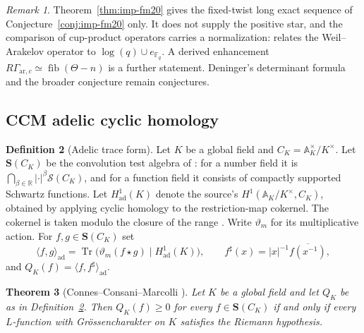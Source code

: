 \documentclass[11pt]{amsart}
\theoremstyle{plain}
\newtheorem{theorem}{Theorem}[section]
\theoremstyle{definition}
\newtheorem{definition}[theorem]{Definition}
\theoremstyle{remark}
\newtheorem{remark}[theorem]{Remark}
\numberwithin{equation}{section}
\newcommand{\R}{\mathbb{R}}
\newcommand{\F}{\mathbb{F}}
\begin{document}
\begin{remark}\label{rem:N-fm20}
Theorem~\ref{thm:imp-fm20} gives the fixed-twist long exact sequence of
Conjecture~\ref{conj:imp-fm20} only. It does not supply the positive
star, and the comparison of cup-product operators carries a
normalization:
\cite[Proposition~3.8, p.~526]{FlachMorin2020DeningerWeilArakelov}
relates the Weil--Arakelov operator to $\log(q)\cup e_{\F_q}$. A derived
enhancement $R\Gamma_{\mathrm{ar},c}\simeq\operatorname{fib}(\Theta-n)$
is a further statement. Deninger's determinant formula
\cite[Conjecture~2, p.~3]{Deninger2010HilbertPolya} and the broader
conjecture \cite[Conjecture~2.3, p.~522]%
{FlachMorin2020DeningerWeilArakelov} remain conjectures.
\end{remark}

\subsection{CCM adelic cyclic homology}

\begin{definition}[Adelic trace form]\label{def:ccm-trace-form}
Let $K$ be a global field and $C_K=\mathbb A_K^\times/K^\times$.
Let $\mathbf S(C_K)$ be the convolution test algebra of
\cite[(4.20), p.~19]{ConnesConsaniMarcolli2009Weil}: for a number
field it is $\bigcap_{\beta\in\R}|\cdot|^\beta\mathcal S(C_K)$,
and for a function field it consists of compactly supported
Schwartz functions. Let $H^1_{\mathrm{ad}}(K)$ denote the source's
$H^1(\mathbb A_K/K^\times,C_K)$, obtained by applying cyclic
homology to the restriction-map cokernel. The cokernel is taken
modulo the closure of the range
\cite[Definition~4.10 and~(4.28), pp.~21--22]%
{ConnesConsaniMarcolli2009Weil}.
Write $\vartheta_m$ for its multiplicative action. For
$f,g\in\mathbf S(C_K)$ set
\[
\langle f,g\rangle_{\mathrm{ad}}=
\operatorname{Tr}\bigl(\vartheta_m(f\star g)
\mid H^1_{\mathrm{ad}}(K)\bigr),\qquad
f^\sharp(x)=|x|^{-1}\overline{f(x^{-1})},
\]
and $Q_K(f)=\langle f,f^\sharp\rangle_{\mathrm{ad}}$.
\end{definition}

\begin{theorem}[{Connes--Consani--Marcolli
\cite[Corollary~6.3, p.~29]{ConnesConsaniMarcolli2009Weil}}]
\label{thm:imp-ccm-positivity}
Let $K$ be a global field and let $Q_K$ be as in
Definition~\ref{def:ccm-trace-form}. Then $Q_K(f)\ge0$ for every
$f\in\mathbf S(C_K)$ if and only if every $L$-function with
Gr\"ossencharakter on $K$ satisfies the Riemann hypothesis.
\end{theorem}
\end{document}
